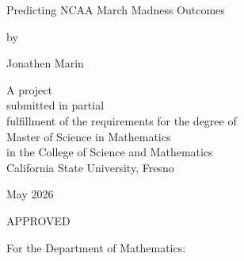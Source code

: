 \documentclass[12pt,leqno]{article}\usepackage[pdftex]{graphicx}\usepackage[usenames,dvipsnames]{xcolor}
\theoremstyle{remark}
\begin{document}
\mbox{}
\thispagestyle{empty}
\newpage

\begin{center}
Predicting NCAA March Madness Outcomes
\end{center}

\vskip 2in

\begin{center}
by
\end{center}

\begin{center}
Jonathen Marin%
\end{center}

\vskip 2in

\begin{center}
A project \\[6pt]
submitted in partial \\[6pt]
fulfillment of the requirements for the degree of \\[6pt]
Master of Science in Mathematics \\[6pt]
in the College of Science and Mathematics \\[6pt]
California State University, Fresno
\end{center}

\begin{center}
May 2026 %
\end{center}
\setcounter{page}{1}
\thispagestyle{empty}
\newpage

\begin{center}
APPROVED
\end{center}

\begin{center}
For the Department of Mathematics:
\end{center}

\end{document}
